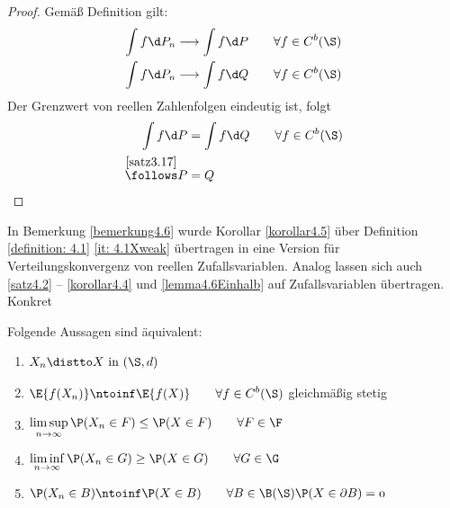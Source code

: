 \begin{proof}
	Gemäß Definition gilt:
	\begin{align*}
		\int f\d P_n&\overset{}{\longrightarrow}\int f\d P\qquad\forall f\in C^b(\S)\\
		\int f\d P_n&\overset{}{\longrightarrow}\int f\d Q\qquad\forall f\in C^b(\S)
	\end{align*}
	Der Grenzwert von reellen Zahlenfolgen eindeutig ist, folgt
	\begin{align*}
		\int f\d P &= \int f\d Q\qquad\forall f\in C^b(\S)\\
		\overset{\ref{satz3.17}}{\follows}
		P &= Q
		\qedhere
	\end{align*}
\end{proof}

In Bemerkung \ref{bemerkung4.6} wurde Korollar \ref{korollar4.5} über Definition \ref{definition: 4.1} \ref{it: 4.1Xweak}
übertragen in eine Version für Verteilungskonvergenz von reellen Zufallsvariablen.
Analog lassen sich auch \ref{satz4.2} -- \ref{korollar4.4} und \ref{lemma4.6Einhalb} auf
Zufallsvariablen übertragen. Konkret

\begin{satz}\label{satz4.7}
	Folgende Aussagen sind äquivalent:
	\begin{enumerate}[label=(\arabic*)]
		\item $\begin{aligned}
			X_n\distto  X\text{ in }(\S,d)
		\end{aligned}$
		\item $\begin{aligned}
			\E{f(X_n)}\ntoinf \E{f(X)}\qquad\forall f\in C^b(\S)
		\end{aligned}$ gleichmäßig stetig
		\item $\begin{aligned}
			\limsup_{n\to\infty}\P(X_n\in F)\le\P(X\in F)\qquad\forall F\in\F
		\end{aligned}$
		\item $\begin{aligned}
			\liminf_{n\to\infty}\P(X_n\in G)\ge\P(X\in G)\qquad\forall G\in\G
		\end{aligned}$
		\item $\begin{aligned}
			\P(X_n\in B)\ntoinf \P(X\in B)\qquad\forall B\in\B(\S)\mit\P(X\in\partial B)=0
		\end{aligned}$
	\end{enumerate}
\end{satz}


